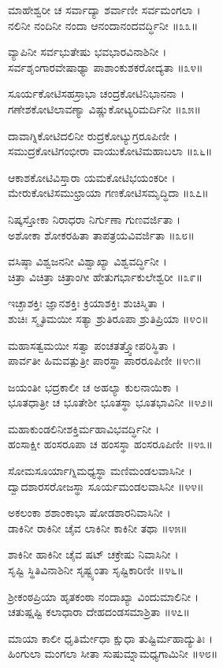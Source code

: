 ಮಾಹೇಶ್ವರೀ ಚ ಸರ್ವಾದ್ಯಾ ಶರ್ವಾಣೀ ಸರ್ವಮಂಗಲಾ ।\\
ನಲಿನೀ ನಂದಿನೀ ನಂದಾ ಆನಂದಾನಂದವರ್ದ್ಧಿನೀ ॥೩೩॥

ವ್ಯಾಪಿನೀ ಸರ್ವಭುತೇಷು ಭವಭಾರವಿನಾಶಿನೀ ।\\
ಸರ್ವಶೃಂಗಾರವೇಷಾಢ್ಯಾ ಪಾಶಾಂಕುಶಕರೋದ್ಯತಾ ॥೩೪॥

ಸೂರ್ಯಕೋಟಿಸಹಸ್ರಾಭಾ ಚಂದ್ರಕೋಟಿನಿಭಾನನಾ ।\\
ಗಣೇಶಕೋಟಿಲಾವಣ್ಯಾ ವಿಷ್ಣುಕೋಟ್ಯರಿಮರ್ದಿನೀ ॥೩೫॥

ದಾವಾಗ್ನಿಕೋಟಿದಲಿನೀ ರುದ್ರಕೋಟ್ಯುಗ್ರರೂಪಿಣೀ ।\\
ಸಮುದ್ರಕೋಟಿಗಂಭೀರಾ ವಾಯುಕೋಟಿಮಹಾಬಲಾ ॥೩೬॥

ಆಕಾಶಕೋಟಿವಿಸ್ತಾರಾ ಯಮಕೋಟಿಭಯಂಕರೀ ।\\
ಮೇರುಕೋಟಿಸಮುಛ್ರಾಯಾ ಗಣಕೋಟಿಸಮೃದ್ಧಿದಾ ॥೩೭॥

ನಿಷ್ಕಸ್ತೋಕಾ ನಿರಾಧರಾ ನಿರ್ಗುಣಾ ಗುಣವರ್ಜಿತಾ ।\\
ಅಶೋಕಾ ಶೋಕರಹಿತಾ ತಾಪತ್ರಯವಿವರ್ಜಿತಾ ॥೩೮॥

ವಸಿಷ್ಠಾ ವಿಶ್ವಜನನೀ ವಿಶ್ವಾಖ್ಯಾ ವಿಶ್ವವರ್ದ್ಧಿನೀ ।\\
ಚಿತ್ರಾ ವಿಚಿತ್ರಾ ಚಿತ್ರಾಂಗೀ ಹೇತುಗರ್ಭಾಕುಲೇಶ್ವರೀ ॥೩೯॥

ಇಚ್ಛಾಶಕ್ತಿಃ ಜ್ಞಾನಶಕ್ತಿಃ ಕ್ರಿಯಾಶಕ್ತಿಃ ಶುಚಿಸ್ಮಿತಾ ।\\
ಶುಚಿಃ ಸ್ಮೃತಿಮಯೀ ಸತ್ಯಾ ಶ್ರುತಿರೂಪಾ ಶ್ರುತಿಪ್ರಿಯಾ ॥೪೦॥

ಮಹಾಸತ್ವಮಯೀ ಸತ್ವಾ ಪಂಚತತ್ತ್ವೋಪರಿಸ್ಥಿತಾ ।\\
ಪಾರ್ವತೀ ಹಿಮವತ್ಪುತ್ರೀ ಪಾರಸ್ಥಾ ಪಾರರೂಪಿಣೀ ॥೪೧॥

ಜಯಂತೀ ಭದ್ರಕಾಲೀ ಚ ಅಹಲ್ಯಾ ಕುಲನಾಯಿಕಾ ।\\
ಭೂತಧಾತ್ರೀ ಚ ಭೂತೇಶೀ ಭೂತಸ್ಥಾ ಭೂತಭಾವಿನೀ ॥೪೨॥

ಮಹಾಕುಂಡಲಿನೀಶಕ್ತಿರ್ಮಹಾವಿಭವರ್ದ್ಧಿನೀ ।\\
ಹಂಸಾಕ್ಷೀ ಹಂಸರೂಪಾ ಚ ಹಂಸಸ್ಥಾ ಹಂಸರೂಪಿಣೀ ॥೪೩॥

ಸೋಮಸೂರ್ಯಾಗ್ನಿಮಧ್ಯಸ್ಥಾ ಮಣಿಮಂಡಲವಾಸಿನೀ ।\\
ದ್ವಾದಶಾರಸರೋಜಸ್ಥಾ ಸೂರ್ಯಮಂಡಲವಾಸಿನೀ ॥೪೪॥

ಅಕಲಂಕಾ ಶಶಾಂಕಾಭಾ ಷೋಡಶಾರನಿವಾಸಿನೀ ।\\
ಡಾಕಿನೀ ರಾಕಿನೀ ಚೈವ ಲಾಕಿನೀ ಕಾಕಿನೀ ತಥಾ ॥೪೫॥

ಶಾಕಿನೀ ಹಾಕಿನೀ ಚೈವ ಷಟ್ ಚಕ್ರೇಷು ನಿವಾಸಿನೀ ।\\
ಸೃಷ್ಟಿ ಸ್ಥಿತಿವಿನಾಶಿನೀ ಸೃಷ್ಟ್ಯಂತಾ ಸೃಷ್ಟಿಕಾರಿಣೀ ॥೪೬॥

ಶ್ರೀಕಂಠಪ್ರಿಯಾ ಹೃತಕಂಠಾ ನಂದಾಖ್ಯಾ ವಿಂದುಮಾಲಿನೀ ।\\
ಚತುಷ್ಷಷ್ಟಿ ಕಲಾಧಾರಾ ದೇಹದಂಡಸಮಾಶ್ರಿತಾ ॥೪೭॥

ಮಾಯಾ ಕಾಲೀ ಧೃತಿರ್ಮೇಧಾ ಕ್ಷುಧಾ ತುಷ್ಟಿರ್ಮಹಾದ್ಯುತಿಃ ।\\
ಹಿಂಗುಲಾ ಮಂಗಲಾ ಸೀತಾ ಸುಷುಮ್ನಾಮಧ್ಯಗಾಮಿನೀ ॥೪೮॥

